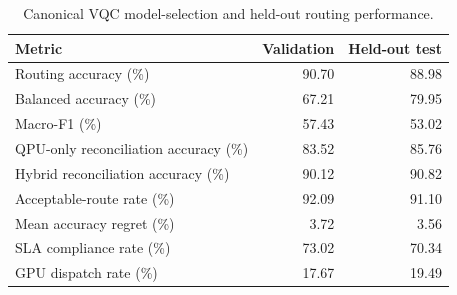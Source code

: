 \begin{table}[t]
\centering
\small
\caption{Canonical VQC model-selection and held-out routing performance.}
\label{tab:vqc-model-selection}
\begin{tabular}{lrr}
\toprule
Metric & Validation & Held-out test \\
\midrule
Routing accuracy (\%) & 90.70 & 88.98 \\
Balanced accuracy (\%) & 67.21 & 79.95 \\
Macro-F1 (\%) & 57.43 & 53.02 \\
QPU-only reconciliation accuracy (\%) & 83.52 & 85.76 \\
Hybrid reconciliation accuracy (\%) & 90.12 & 90.82 \\
Acceptable-route rate (\%) & 92.09 & 91.10 \\
Mean accuracy regret (\%) & 3.72 & 3.56 \\
SLA compliance rate (\%) & 73.02 & 70.34 \\
GPU dispatch rate (\%) & 17.67 & 19.49 \\
\bottomrule
\end{tabular}
\end{table}
